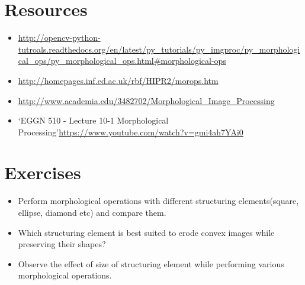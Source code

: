 \documentclass[]{article}
\providecommand{\tightlist}{%
  \setlength{\itemsep}{0pt}\setlength{\parskip}{0pt}}
\begin{document}
\section{Resources}\label{resources}

\begin{itemize}
\tightlist
\item
  \url{http://opencv-python-tutroals.readthedocs.org/en/latest/py_tutorials/py_imgproc/py_morphological_ops/py_morphological_ops.html\#morphological-ops}
\item
  \url{http://homepages.inf.ed.ac.uk/rbf/HIPR2/morops.htm}
\item
  \url{http://www.academia.edu/3482702/Morphological_Image_Processing}
\item
  `EGGN 510 - Lecture 10-1 Morphological
  Processing'\url{https://www.youtube.com/watch?v=gmi4ah7YAi0}
\end{itemize}

\section{Exercises}\label{exercises}

\begin{itemize}
\tightlist
\item
  Perform morphological operations with different structuring
  elements(square, ellipse, diamond etc) and compare them.
\item
  Which structuring element is best suited to erode convex images while
  preserving their shapes?
\item
  Observe the effect of size of structuring element while performing
  various morphological operations.
\end{itemize}
\end{document}
